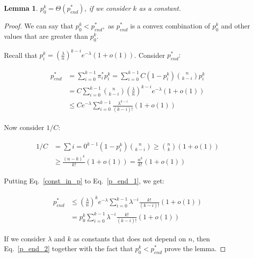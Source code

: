 \documentclass{article}
\newtheorem{lemma}{Lemma}
\begin{document}
\begin{lemma}
  $p_0^k = \Theta(p_{end}^*)$, if we consider $k$ as a constant.
\end{lemma}
\begin{proof}
  We can say that $p_0^k < p_{end}^*,$ as $p_{end}^*$ is a convex combination of $p_0^k$ and other values that are greater than $p_0^k$.

  Recall that $p_i^k = \left(\frac{\lambda}{n}\right)^{k - i} e^{-\lambda} (1 + o(1))$. Consider $p_{end}^*:$

  \begin{align}\label{p_end_1}
  \begin{split}
    p_{end}^* &= \sum\limits_{i = 0}^{k - 1} \pi_i^* p_i^k = \sum\limits_{i = 0}^{k - 1} C (1 - p_i^k) \binom{n}{k - i} p_i^k \\
    &= C \sum\limits_{i = 0}^{k - 1} \binom{n}{k - i} \left(\frac{\lambda}{n}\right)^{k - i} e^{-\lambda} (1 + o(1)) \\
    &\le C e^{-\lambda} \sum\limits_{i = 0}^{k - 1} \frac{\lambda^{k - i}}{(k - i)!} (1 + o(1))
  \end{split}
  \end{align}

  Now consider $1/C$:

  \begin{align}\label{const_in_p}
  \begin{split}
    1/C &= \sum{i = 0}^{k - 1} (1 - p_i^k) \binom{n}{k - i} \ge \binom{n}{k} (1 + o(1)) \\
    &\ge \frac{(n - k)^k}{k!} (1 + o(1)) = \frac{n^k}{k!} (1 + o(1))
  \end{split}
  \end{align}

  Putting Eq.~\ref{const_in_p} to Eq.~\ref{p_end_1}, we get:

  \begin{align}\label{p_end_2}
  \begin{split}
    p_{end}^* & \le \left(\frac{\lambda}{n}\right)^k  e^{-\lambda} \sum\limits_{i = 0}^{k - 1} \lambda^{-i} \frac{k!}{(k - i)!} (1 + o(1)) \\
    &= p_0^k \sum\limits_{i = 0}^{k - 1} \lambda^{-i} \frac{k!}{(k - i)!} (1 + o(1))
  \end{split}
  \end{align}

  If we consider $\lambda$ and $k$ as constants that does not depend on $n$, then Eq.~\ref{p_end_2} together with the fact that $p_0^k < p_{end}^*$ prove the lemma.
\end{proof}
\end{document}
